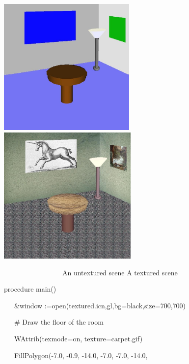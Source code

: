\documentclass[letterpaper]{article}
\begin{document}
{\bigskip

{
 \includegraphics[width=2.6543in,height=2.6693in]{utr9/utr9-img032.jpg} \textbf{ \ \ \ \ \ \ \ \ \ \ \ \ \ }
\includegraphics[width=2.6846in,height=2.6693in]{utr9/utr9-img033.jpg} }

\ \ \ \ \ \ \ \ \ \ \ \ \ \ \ \ \ 
An untextured scene \hfill A textured scene
\ \ \ \ \ \ \ \ \ \ \ \ \ \ \ \ \ 


\bigskip

{\sffamily
procedure main()}

{\sffamily
\ \ \ \&window
:=open({\textquotedbl}textured.icn{\textquotedbl},{\textquotedbl}gl{\textquotedbl},{\textquotedbl}bg=black{\textquotedbl},{\textquotedbl}size=700,700{\textquotedbl})}


\bigskip

{\sffamily
\ \ \ \# Draw the floor of the room}

{\sffamily
\ \ \ WAttrib({\textquotedbl}texmode=on{\textquotedbl}, {\textquotedbl}texture=carpet.gif{\textquotedbl})}

{\sffamily
\ \ \ FillPolygon(-7.0, -0.9, -14.0, -7.0, -7.0, -14.0,}

}
\end{document}
